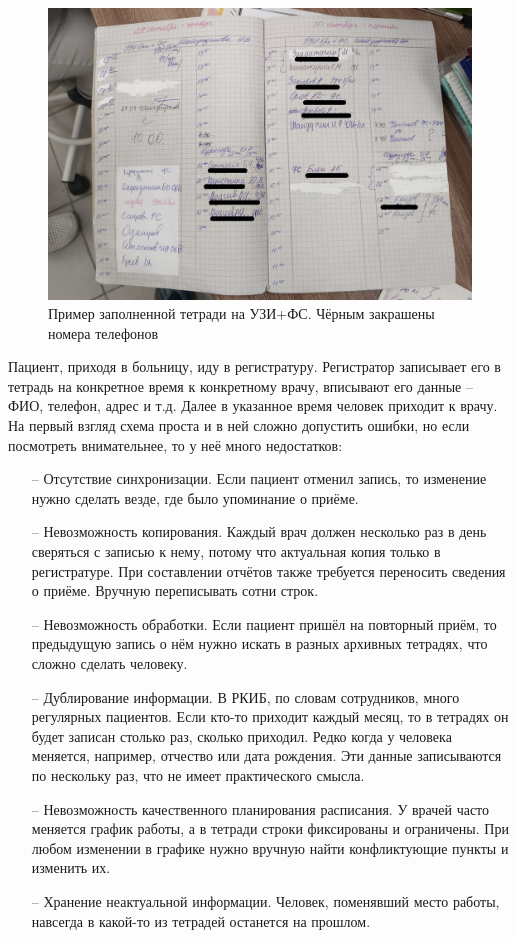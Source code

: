 \documentclass[a4paper,article]{article}
\begin{document}
\begin{sloppypar}
        \begin{figure}[h]
            \centering
            \includegraphics[width=0.8\linewidth]{Пример заполненной тетради на УЗИ+ФС. Чёрным закрашены номера телефонов.png}
            \caption{\centering Пример заполненной тетради на УЗИ+ФС. Чёрным закрашены номера телефонов}
            \label{fig:Тетрадь на УЗИ+ФС}
        \end{figure}

        Пациент, приходя в больницу, иду в регистратуру. Регистратор записывает его в тетрадь на конкретное время к конкретному врачу, вписывают его данные  -- ФИО, телефон, адрес и т.д. Далее в указанное время человек приходит к врачу.
        На первый взгляд схема проста и в ней сложно допустить ошибки, но если посмотреть внимательнее, то у неё много недостатков:

        \begin{itemize}[nolistsep]
            \item[--] Отсутствие синхронизации. Если пациент отменил запись, то изменение нужно сделать везде, где было упоминание о приёме.
            \item[--] Невозможность копирования. Каждый врач должен несколько раз в день сверяться с записью к нему, потому что актуальная копия только в регистратуре. При составлении отчётов также требуется переносить сведения о приёме. Вручную переписывать сотни строк.
            \item[--] Невозможность обработки. Если пациент пришёл на повторный приём, то предыдущую запись о нём нужно искать в разных архивных тетрадях, что сложно сделать человеку.
            \item[--] Дублирование информации. В РКИБ, по словам сотрудников, много регулярных пациентов. Если кто-то приходит каждый месяц, то в тетрадях он будет записан столько раз, сколько приходил. Редко когда у человека меняется, например, отчество или дата рождения. Эти данные записываются по нескольку раз, что не имеет практического смысла.
            \item[--] Невозможность качественного планирования расписания. У врачей часто меняется график работы, а в тетради строки фиксированы и ограничены. При любом изменении в графике нужно вручную найти конфликтующие пункты и изменить их.
            \item[--] Хранение неактуальной информации. Человек, поменявший место работы, навсегда в какой-то из тетрадей останется на прошлом.
        \end{itemize}


\end{sloppypar}
\end{document}
